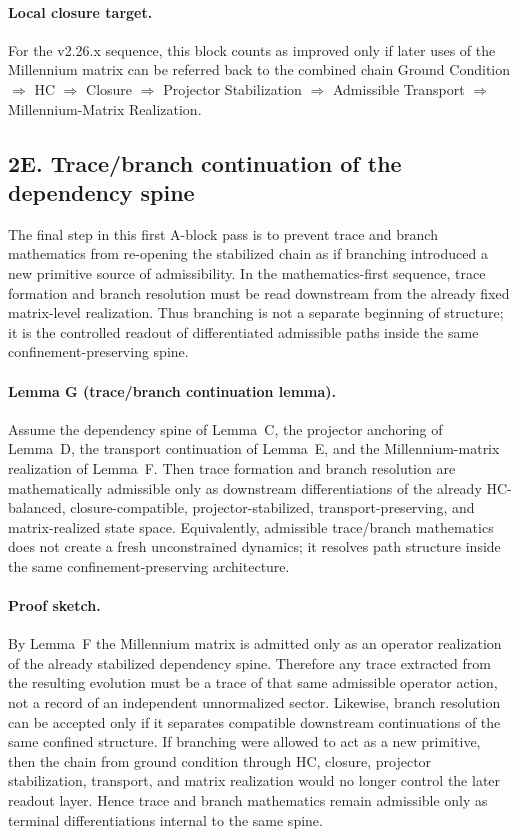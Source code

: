 \documentclass[12pt,a4paper]{article}
\begin{document}
\paragraph{Local closure target.}
For the v2.26.x sequence, this block counts as improved only if later uses of
the Millennium matrix can be referred back to the combined chain
Ground Condition $\Rightarrow$ HC $\Rightarrow$ Closure $\Rightarrow$
Projector Stabilization $\Rightarrow$ Admissible Transport $\Rightarrow$
Millennium-Matrix Realization.


\subsection*{2E. Trace/branch continuation of the dependency spine}
The final step in this first A-block pass is to prevent trace and branch
mathematics from re-opening the stabilized chain as if branching introduced a
new primitive source of admissibility. In the mathematics-first sequence, trace
formation and branch resolution must be read downstream from the already fixed
matrix-level realization. Thus branching is not a separate beginning of
structure; it is the controlled readout of differentiated admissible paths
inside the same confinement-preserving spine.

\paragraph{Lemma G (trace/branch continuation lemma).}
Assume the dependency spine of Lemma~C, the projector anchoring of Lemma~D, the
transport continuation of Lemma~E, and the Millennium-matrix realization of
Lemma~F. Then trace formation and branch resolution are mathematically
admissible only as downstream differentiations of the already HC-balanced,
closure-compatible, projector-stabilized, transport-preserving, and
matrix-realized state space. Equivalently, admissible trace/branch mathematics
does not create a fresh unconstrained dynamics; it resolves path structure
inside the same confinement-preserving architecture.

\paragraph{Proof sketch.}
By Lemma~F the Millennium matrix is admitted only as an operator realization of
the already stabilized dependency spine. Therefore any trace extracted from the
resulting evolution must be a trace of that same admissible operator action,
not a record of an independent unnormalized sector. Likewise, branch resolution
can be accepted only if it separates compatible downstream continuations of the
same confined structure. If branching were allowed to act as a new primitive,
then the chain from ground condition through HC, closure, projector
stabilization, transport, and matrix realization would no longer control the
later readout layer. Hence trace and branch mathematics remain admissible only
as terminal differentiations internal to the same spine.
\end{document}
